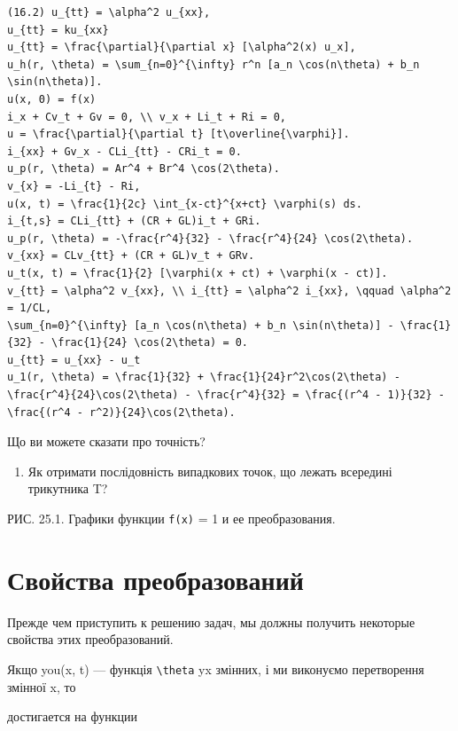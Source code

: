 \documentclass[
  ukrainian,
]{article}
\providecommand{\tightlist}{%
  \setlength{\itemsep}{0pt}\setlength{\parskip}{0pt}}
\begin{document}
\begin{verbatim}
(16.2) u_{tt} = \alpha^2 u_{xx},
u_{tt} = ku_{xx}
u_{tt} = \frac{\partial}{\partial x} [\alpha^2(x) u_x],
u_h(r, \theta) = \sum_{n=0}^{\infty} r^n [a_n \cos(n\theta) + b_n \sin(n\theta)].
u(x, 0) = f(x)
i_x + Cv_t + Gv = 0, \\ v_x + Li_t + Ri = 0,
u = \frac{\partial}{\partial t} [t\overline{\varphi}].
i_{xx} + Gv_x - CLi_{tt} - CRi_t = 0.
u_p(r, \theta) = Ar^4 + Br^4 \cos(2\theta).
v_{x} = -Li_{t} - Ri,
u(x, t) = \frac{1}{2c} \int_{x-ct}^{x+ct} \varphi(s) ds.
i_{t,s} = CLi_{tt} + (CR + GL)i_t + GRi.
u_p(r, \theta) = -\frac{r^4}{32} - \frac{r^4}{24} \cos(2\theta).
v_{xx} = CLv_{tt} + (CR + GL)v_t + GRv.
u_t(x, t) = \frac{1}{2} [\varphi(x + ct) + \varphi(x - ct)].
v_{tt} = \alpha^2 v_{xx}, \\ i_{tt} = \alpha^2 i_{xx}, \qquad \alpha^2 = 1/CL,
\sum_{n=0}^{\infty} [a_n \cos(n\theta) + b_n \sin(n\theta)] - \frac{1}{32} - \frac{1}{24} \cos(2\theta) = 0.
u_{tt} = u_{xx} - u_t
u_1(r, \theta) = \frac{1}{32} + \frac{1}{24}r^2\cos(2\theta) - \frac{r^4}{24}\cos(2\theta) - \frac{r^4}{32} = \frac{(r^4 - 1)}{32} - \frac{(r^4 - r^2)}{24}\cos(2\theta).
\end{verbatim}

Що ви можете сказати про точність?

\begin{enumerate}
\def\labelenumi{\arabic{enumi}.}
\setcounter{enumi}{3}
\tightlist
\item
  Як отримати послідовність випадкових точок, що лежать всередині
  трикутника T?
\end{enumerate}

РИС. 25.1. Графики функции \texttt{f(x)} = 1 и ее преобразования.

\section{Свойства
преобразований}\label{ux441ux432ux43eux439ux441ux442ux432ux430-ux43fux440ux435ux43eux431ux440ux430ux437ux43eux432ux430ux43dux438ux439-1}

Прежде чем приступить к решению задач, мы должны получить некоторые
свойства этих преобразований.

Якщо you(x, t) --- функція \partial \texttt{\textbackslash{}theta} yx
змінних, і ми виконуємо перетворення змінної x, то

достигается на функции
\end{document}
